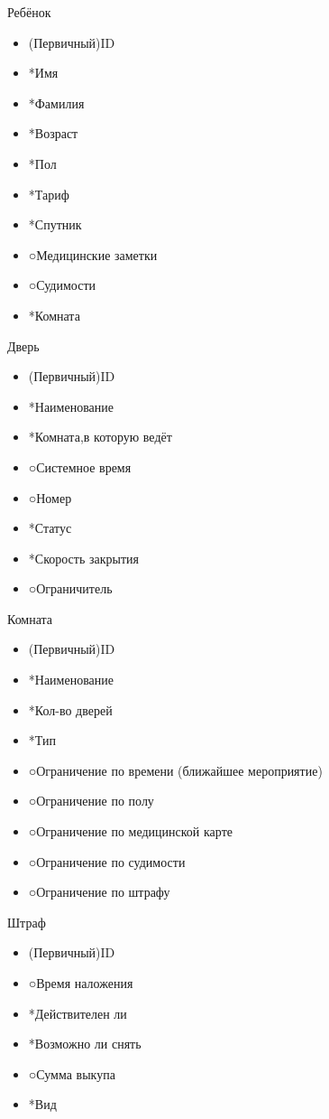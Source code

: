 Ребёнок
\begin{itemize}
	\item (Первичный)ID
	\item *Имя
	\item *Фамилия
	\item *Возраст
	\item *Пол
	\item *Тариф
	\item *Спутник
	\item ○Медицинские заметки
	\item ○Судимости
	\item *Комната	
\end{itemize}

Дверь
\begin{itemize}
	\item (Первичный)ID
	\item *Наименование
	\item *Комната,в которую ведёт
	\item ○Системное время
	\item ○Номер
	\item *Статус
	\item *Скорость закрытия
	\item ○Ограничитель
\end{itemize}

Комната
\begin{itemize}
	\item (Первичный)ID
	\item *Наименование
	\item *Кол-во дверей
	\item *Тип
	\item ○Ограничение по времени (ближайшее мероприятие)
	\item ○Ограничение по полу
	\item ○Ограничение по медицинской карте
	\item ○Ограничение по судимости
	\item ○Ограничение по штрафу	
\end{itemize}

Штраф
\begin{itemize}
	\item (Первичный)ID
	\item ○Время наложения
	\item *Действителен ли
	\item *Возможно ли снять
	\item ○Сумма выкупа
	\item *Вид
	
\end{itemize}

